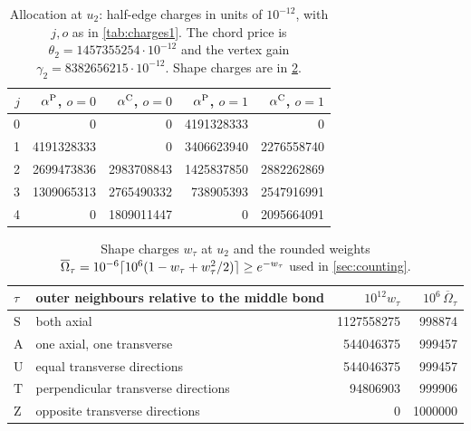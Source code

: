 \begin{table}[t]
\centering\small
\caption{Allocation at $u_2$: half-edge charges in units of $10^{-12}$, with $j,o$ as in \cref{tab:charges1}. The chord price is $\theta_2=1457355254\cdot10^{-12}$ and the vertex gain $\gamma_2=8382656215\cdot10^{-12}$. Shape charges are in \cref{tab:shapes}.}\label{tab:charges2}
\begin{tabular}{rrrrr}
\toprule
$j$ & $\alpha^{\rm P}$, $o=0$ & $\alpha^{\rm C}$, $o=0$ & $\alpha^{\rm P}$, $o=1$ & $\alpha^{\rm C}$, $o=1$\\
\midrule
0 & 0 & 0 & 4191328333 & 0 \\
1 & 4191328333 & 0 & 3406623940 & 2276558740 \\
2 & 2699473836 & 2983708843 & 1425837850 & 2882262869 \\
3 & 1309065313 & 2765490332 & 738905393 & 2547916991 \\
4 & 0 & 1809011447 & 0 & 2095664091 \\
\bottomrule
\end{tabular}
\end{table}

\begin{table}[t]
\centering\small
\caption{Shape charges $w_\tau$ at $u_2$ and the rounded weights $\overline\Omega_\tau=10^{-6}\lceil 10^6(1-w_\tau+w_\tau^2/2)\rceil\ge e^{-w_\tau}$ used in \cref{sec:counting}.}\label{tab:shapes}
\begin{tabular}{llrr}
\toprule
$\tau$ & outer neighbours relative to the middle bond & $10^{12}w_\tau$ & $10^6\,\overline\Omega_\tau$\\
\midrule
$\mathrm S$ & both axial & 1127558275 & 998874 \\
$\mathrm A$ & one axial, one transverse & 544046375 & 999457 \\
$\mathrm U$ & equal transverse directions & 544046375 & 999457 \\
$\mathrm T$ & perpendicular transverse directions & 94806903 & 999906 \\
$\mathrm Z$ & opposite transverse directions & 0 & 1000000 \\
\bottomrule
\end{tabular}
\end{table}

